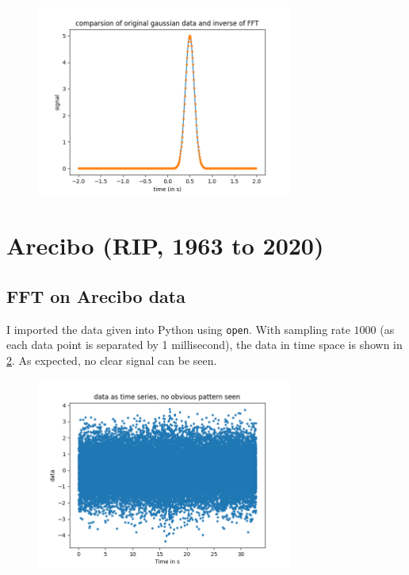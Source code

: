 \documentclass{article}
\begin{document}
\begin{figure}[h!]
\centering
\includegraphics[width=0.75\textwidth]{plots/gauss_inverse.png}
\caption{\label{fig:gauss_inverse}  }
\end{figure}

\section{Arecibo (RIP, 1963 to 2020)}

\subsection{FFT on Arecibo data}

I imported the data given into Python using \texttt{open}. With sampling rate $1000$ (as each data point is separated by 1 millisecond), the data in time space is shown in \ref{fig:arecibo_time}. As expected, no clear signal can be seen.

\begin{figure}[h!]
\centering
\includegraphics[width=0.75\textwidth]{plots/arecibo_time.png}
\caption{\label{fig:arecibo_time}  }
\end{figure}
\end{document}
